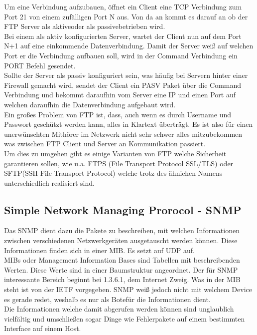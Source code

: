 \documentclass[11pt,a4paper]{report}
\begin{document}
Um eine Verbindung aufzubauen, öffnet ein Client eine TCP Verbindung zum Port 21 von einem zufälligen Port N aus. Von da an kommt es darauf an ob der FTP Server 
als \glqq aktive\grqq oder als \glqq passive\grqq betrieben wird.\\
Bei einem als aktiv konfigurierten Server, wartet der Client nun auf dem Port N+1 auf eine einkommende Datenverbindung. Damit der Server weiß auf welchen Port er 
die Verbindung aufbauen soll, wird in der Command Verbindung ein PORT Befehl gesendet.\\
Sollte der Server als passiv konfiguriert sein, was häufig bei Servern hinter einer Firewall gemacht wird, sendet der Client ein PASV Paket über die Command 
Verbindung und bekommt daraufhin vom Server eine IP und einen Port auf welchen daraufhin die Datenverbindung aufgebaut wird.\\

Ein großes Problem von FTP ist, dass, auch wenn es durch Username und Passwort geschützt werden kann, alles in Klartext überträgt. Es ist also für einen 
unerwünschten Mithörer im Netzwerk nicht sehr schwer alles mitzubekommen was zwischen FTP Client und Server an Kommunikation passiert.\\
Um dies zu umgehen gibt es einige Varianten von FTP welche Sicherheit garantieren sollen, wie u.a. FTPS (File Transport Protocol SSL/TLS) oder SFTP(SSH File 
Transport Protocol) welche trotz des ähnichen Namens unterschiedlich realisiert sind. 
 
\subsection{Simple Network Managing Prorocol - SNMP}
Das SNMP dient dazu die Pakete zu beschreiben, mit welchen Informationen zwischen verschiedenen Netzwerkgeräten ausgetauscht werden können. Diese Informationen finden sich in einer MIB. Es setzt auf UDP auf.\\

MIBs oder Management Information Bases sind Tabellen mit beschreibenden Werten. Diese Werte sind in einer Baumstruktur angeordnet. Der für SNMP interessante Bereich beginnt bei 1.3.6.1, dem Internet Zweig. Was in der MIB steht ist von der IETF vorgegeben. SNMP weiß jedoch nicht mit welchem Device es gerade redet, weshalb es nur als \glqq Bote\grqq für die Informationen dient.\\
Die Informationen welche damit abgerufen werden können sind unglaublich vielfältig und umschließen sogar Dinge wie Fehlerpakete auf einem bestimmten Interface auf einem Host.\\
\end{document}

